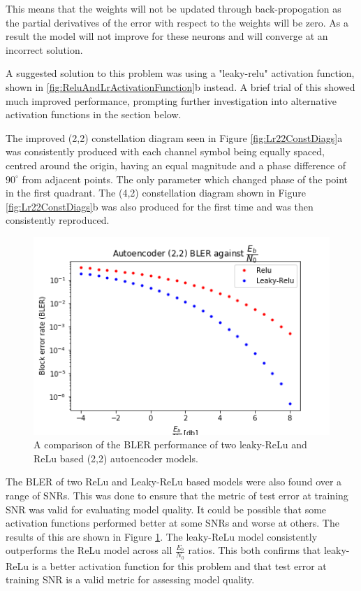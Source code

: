 \documentclass[12pt,onecolumn,letterpaper]{article}
\newcommand\genfigsize{0.5}
\begin{document}
This means that the weights will not be updated through back-propogation as the partial derivatives of the error with respect to the weights will be zero. As a result the model will not improve for these neurons and will converge at an incorrect solution. 

A suggested solution to this problem was using a "leaky-relu" activation function, shown in \ref{fig:ReluAndLrActivationFunction}b instead. A brief trial of this showed much improved performance, prompting further investigation into alternative activation functions in the section below. 

The improved (2,2) constellation diagram seen in Figure \ref{fig:Lr22ConstDiags}a was consistently produced with each channel symbol being equally spaced, centred around the origin, having an equal magnitude and a phase difference of $90^{\circ}$ from adjacent points. The only parameter which changed phase of the point in the first quadrant. The (4,2) constellation diagram shown in Figure \ref{fig:Lr22ConstDiags}b was also produced for the first time and was then consistently reproduced. 

\begin{figure}[t]
   \centering
   \includegraphics[width=\genfigsize\linewidth]{figures/autoencoder_2_2_bler_EbNo_leaky_vs_relu.png}
   \caption{A comparison of the BLER performance of two leaky-ReLu and ReLu based (2,2) autoencoder models.}
   \label{fig:ReluVsLrBlerAcrossSnrs}
\end{figure}

The BLER of two ReLu and Leaky-ReLu based models were also found over a range of SNRs. This was done to ensure that the metric of test error at training SNR was valid for evaluating model quality. It could be possible that some activation functions performed better at some SNRs and worse at others. The results of this are shown in Figure \ref{fig:ReluVsLrBlerAcrossSnrs}. The leaky-ReLu model consistently outperforms the ReLu model across all $\frac{E_b}{N_0}$ ratios. This both confirms that leaky-ReLu is a better activation function for this problem and that test error at training SNR is a valid metric for assessing model quality.
\end{document}

